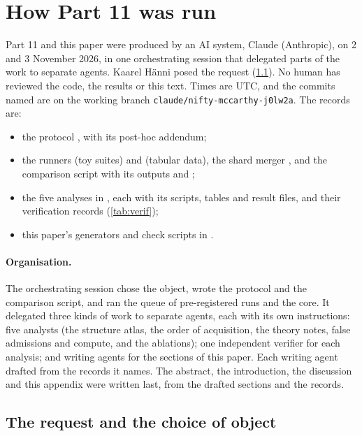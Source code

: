 \clearpage
\section{How Part 11 was run}\label{app:provenance}

Part 11 and this paper were produced by an AI system, Claude (Anthropic), on 2 and 3 November 2026, in one orchestrating session that delegated parts of the work to separate agents. Kaarel H\"anni posed the request (\cref{app:choice}). No human has reviewed the code, the results or this text. Times are UTC, and the commits named are on the working branch \texttt{claude/nifty-mccarthy-j0lw2a}. The records are:
\begin{itemize}
\item the protocol , with its post-hoc addendum;
\item the runners  (toy suites) and  (tabular data), the shard merger , and the comparison script  with its outputs  and ;
\item the five analyses in , each with its scripts, tables and result files, and their verification records (\cref{tab:verif});
\item this paper's generators and check scripts in .
\end{itemize}

\paragraph{Organisation.} The orchestrating session chose the object, wrote the protocol and the comparison script, and ran the queue of pre-registered runs and the core. It delegated three kinds of work to separate agents, each with its own instructions: five analysts (the structure atlas, the order of acquisition, the theory notes, false admissions and compute, and the ablations); one independent verifier for each analysis; and writing agents for the sections of this paper. Each writing agent drafted from the records it names. The abstract, the introduction, the discussion and this appendix were written last, from the drafted sections and the records.

\subsection{The request and the choice of object}\label{app:choice}


